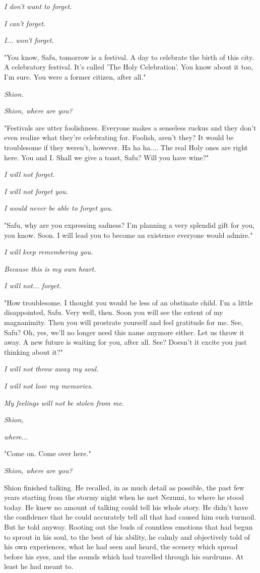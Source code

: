 \emph{I don't want to forget.}

\emph{I can't forget.}

\emph{I... won't forget.}

"You know, Safu, tomorrow is a festival. A day to celebrate the birth of
this city. A celebratory festival. It's called 'The Holy Celebration'.
You know about it too, I'm sure. You were a former citizen, after all."

\emph{Shion.}

\emph{Shion, where are you?}

"Festivals are utter foolishness. Everyone makes a senseless ruckus and
they don't even realize what they're celebrating for. Foolish, aren't
they? It would be troublesome if they weren't, however. Ha ha ha.... The
real Holy ones are right here. You and I. Shall we give a toast, Safu?
Will you have wine?"

\emph{I will not forget.}

\emph{I will not forget you.}

\emph{I would never be able to forget you.}

"Safu, why are you expressing sadness? I'm planning a very splendid gift
for you, you know. Soon. I will lead you to become an existence everyone
would admire."

\emph{I will keep remembering you.}

\emph{Because this is my own heart.}

\emph{I will not... forget.}

"How troublesome. I thought you would be less of an obstinate child. I'm
a little disappointed, Safu. Very well, then. Soon you will see the
extent of my magnanimity. Then you will prostrate yourself and feel
gratitude for me. See, Safu? Oh, yes, we'll no longer need this name
anymore either. Let us throw it away. A new future is waiting for you,
after all. See? Doesn't it excite you just thinking about it?"

\emph{I will not throw away my soul.}

\emph{I will not lose my memories.}

\emph{My feelings will not be stolen from me.}

\emph{Shion,}

\emph{where...}

"Come on. Come over here."

\emph{Shion, where are you?}

\myspace

Shion finished talking. He recalled, in as much detail as possible, the
past few years starting from the stormy night when he met Nezumi, to
where he stood today. He knew no amount of talking could tell his whole
story. He didn't have the confidence that he could accurately tell all
that had caused him such turmoil. But he told anyway. Rooting out the
buds of countless emotions that had begun to sprout in his soul, to the
best of his ability, he calmly and objectively told of his own
experiences, what he had seen and heard, the scenery which spread before
his eyes, and the sounds which had travelled through his eardrums. At
least he had meant to.

